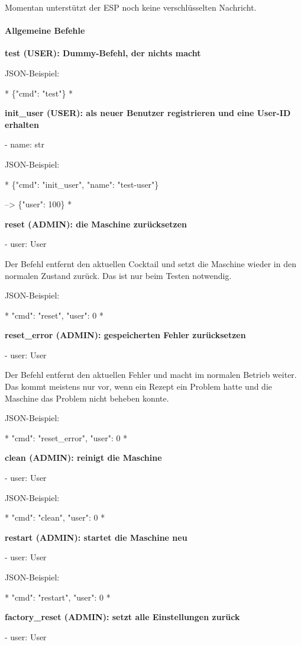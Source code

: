 Momentan unterstützt der ESP noch keine verschlüsselten Nachricht.

\paragraph{ Allgemeine Befehle}

\textbf{ test (USER): Dummy-Befehl, der nichts macht}

JSON-Beispiel:

*
\{"cmd": "test"\}
*

\textbf{ init\_user (USER): als neuer Benutzer registrieren und eine User-ID erhalten}

- name: str

JSON-Beispiel:

*
\{"cmd": "init\_user", "name": "test-user"\}

--> \{"user": 100\}
*

\textbf{ reset (ADMIN): die Maschine zurücksetzen}

- user: User

Der Befehl entfernt den aktuellen Cocktail und setzt die Maschine wieder in den normalen Zustand zurück. Das ist nur beim Testen notwendig.

JSON-Beispiel:

*
{"cmd": "reset", "user": 0}
*

\textbf{ reset\_error (ADMIN): gespeicherten Fehler zurücksetzen}

- user: User

Der Befehl entfernt den aktuellen Fehler und macht im normalen Betrieb weiter. Das kommt meistens nur vor, wenn ein Rezept ein Problem hatte und die Maschine das Problem nicht beheben konnte.

JSON-Beispiel:

*
{"cmd": "reset\_error", "user": 0}
*

\textbf{ clean (ADMIN): reinigt die Maschine}

- user: User

JSON-Beispiel:

*
{"cmd": "clean", "user": 0}
*

\textbf{ restart (ADMIN): startet die Maschine neu}

- user: User

JSON-Beispiel:

*
{"cmd": "restart", "user": 0}
*

\textbf{ factory\_reset (ADMIN): setzt alle Einstellungen zurück}

- user: User

